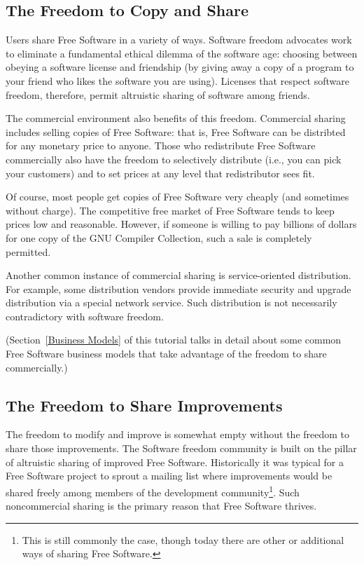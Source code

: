 \subsection{The Freedom to Copy and Share}

Users share Free Software in a variety of ways. Software freedom advocates
work to eliminate a fundamental ethical dilemma of the software age: choosing
between obeying a software license and friendship (by giving away a copy of a
program to your friend who likes the software you are using). Licenses that
respect software freedom, therefore, permit altruistic sharing of software
among friends.

The commercial environment also benefits of this freedom.  Commercial sharing
includes selling copies of Free Software: that is, Free Software can
be distribted for any monetary
price to anyone.  Those who redistribute Free Software commercially also have
the freedom to selectively distribute (i.e., you can pick your customers) and
to set prices at any level that redistributor sees fit.

Of course, most people get copies of Free Software very cheaply (and
sometimes without charge).  The competitive free market of Free Software
tends to keep prices low and reasonable.  However, if someone is willing to
pay billions of dollars for one copy of the GNU Compiler Collection, such a
sale is completely permitted.

Another common instance of commercial sharing is service-oriented
distribution.  For example, some distribution vendors provide immediate
security and upgrade distribution via a special network service.  Such
distribution is not necessarily contradictory with software freedom.

(Section~\ref{Business Models} of this tutorial talks in detail about some
common Free Software business models that take advantage of the freedom to
share commercially.)

\subsection{The Freedom to Share Improvements}

The freedom to modify and improve is somewhat empty without the freedom to
share those improvements.  The Software freedom community is built on the
pillar of altruistic sharing of improved Free Software. Historically
it was typical for a
Free Software project to sprout a mailing list where improvements
would be shared
freely among members of the development community\footnote{This is still
commonly the case, though today there are other or additional ways of
sharing Free Software.}.   Such noncommercial
sharing is the primary reason that Free Software thrives.

